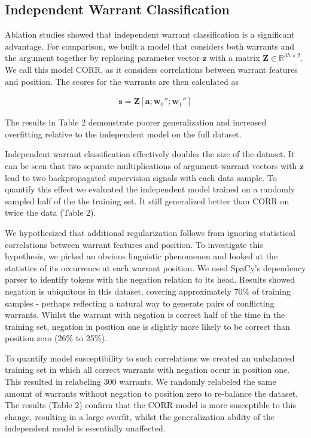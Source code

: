 \documentclass[11pt,a4paper]{article}
\begin{document}
\subsection{Independent Warrant Classification}

Ablation studies showed that independent warrant classification is a significant advantage.
For comparison, we built a model that considers both warrants and the argument together
  by replacing parameter vector $\mathbf{z}$ 
  with a matrix $\mathbf{Z} \in \mathbb{R}^{3h \times 2}$.
We call this model CORR, as it considers correlations between warrant features and position.
The scores for the warrants are then calculated as

\begin{align*}
  \mathbf{s} = \mathbf{Z} [\mathbf{a} ; \mathbf{w}_0'' ; \mathbf{w}_1'']
\end{align*}

\vspace{12pt}

\noindent
The results in Table 2 demonstrate poorer generalization and increased overfitting 
  relative to the independent model on the full dataset.

Independent warrant classification effectively doubles the size of the dataset.
It can be seen that two separate multiplications of argument-warrant vectors with $\mathbf{z}$
  lead to two backpropagated supervision signals with each data sample.
To quantify this effect we evaluated the independent model trained on
  a randomly sampled half of the the training set.
It still generalized better than CORR on twice the data (Table 2).

We hypothesized that additional regularization follows from 
  ignoring statistical correlations between warrant features and position.
To investigate this hypothesis, we picked an obvious linguistic phenomenon 
  and looked at the statistics of its occurrence at each warrant position.
We used SpaCy's dependency parser to identify tokens with the negation relation to its head.
Results showed negation is ubiquitous in this dataset, covering approximately 70\% of training samples -
  perhaps reflecting a natural way to generate pairs of conflicting warrants.
Whilst the warrant with negation is correct half of the time in the training set,
  negation in position one is slightly more likely to be correct than position zero (26\% to 25\%).

To quantify model susceptibility to such correlations 
  we created an unbalanced training set in which 
  all correct warrants with negation occur in position one.
This resulted in relabeling 300 warrants.
We randomly relabeled the same amount of warrants without negation to position zero 
  to re-balance the dataset.
The results (Table 2) confirm that the CORR model is more susceptible to this change,
  resulting in a large overfit,
  whilst the generalization ability of the independent model is essentially unaffected.
\end{document}
